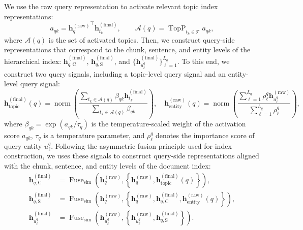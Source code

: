 \documentclass{article} %
\begin{document}
We use the raw query representation to activate relevant topic index representations:
\begin{equation}
a_{qk}
=
{\mathbf{h}_{q}^{(\mathrm{raw})}}^{\top}
\mathbf{h}_{t_k}^{(\mathrm{final})},
\qquad
\mathcal{A}(q)
=
\operatorname{TopP}_{t_k\in\mathcal{T}} a_{qk},
\label{eq:query_topic_activation}
\end{equation}
where $\mathcal{A}(q)$ is the set of activated topics. Then, we construct query-side representations that correspond to the chunk, sentence, and entity levels of the hierarchical index: $\mathbf{h}_{q,\mathrm{C}}^{(\mathrm{final})}$, $\mathbf{h}_{q,\mathrm{S}}^{(\mathrm{final})}$, and $\{\mathbf{h}_{u_{\ell}^{q}}^{(\mathrm{final})}\}_{\ell=1}^{L_q}$. To this end, we construct two query signals, including a topic-level query signal and an entity-level query signal:
\begin{equation}
\mathbf{h}_{\mathrm{topic}}^{(\mathrm{final})}(q)
=
\operatorname{norm}\!\left(
\frac{
\sum_{t_k\in\mathcal{A}(q)}
\beta_{qk}\mathbf{h}_{t_k}^{(\mathrm{final})}
}{
\sum_{t_k\in\mathcal{A}(q)}
\beta_{qk}
}
\right),
\quad
\mathbf{h}_{\mathrm{entity}}^{(\mathrm{raw})}(q)
=
\operatorname{norm}\!\left(
\frac{
\sum_{\ell=1}^{L_q}
\rho_{\ell}^{q}\mathbf{h}_{u_{\ell}^{q}}^{(\mathrm{raw})}
}{
\sum_{\ell=1}^{L_q}\rho_{\ell}^{q}
}
\right),
\label{eq:query_context_evidence_aggregation}
\end{equation}
where $\beta_{qk}=\exp(a_{qk}/\tau_q)$ is the temperature-scaled weight of the activation score $a_{qk}$, $\tau_q$ is a temperature parameter, and $\rho_{\ell}^{q}$ denotes the importance score of query entity $u_{\ell}^{q}$.  Following the asymmetric fusion principle used for index construction, we uses these signals to construct query-side representations aligned with the chunk, sentence, and entity levels of the document index:
\begin{equation}
\begin{aligned}
\mathbf{h}_{q,\mathrm{C}}^{(\mathrm{final})}
&=
\operatorname{Fuse}_{\mathrm{sim}}\!\left(
\mathbf{h}_{q}^{(\mathrm{raw})},
\left\{
\mathbf{h}_{q}^{(\mathrm{raw})},
\mathbf{h}_{\mathrm{topic}}^{(\mathrm{final})}(q)
\right\}
\right), \\
\mathbf{h}_{q,\mathrm{S}}^{(\mathrm{final})}
&=
\operatorname{Fuse}_{\mathrm{sim}}\!\left(
\mathbf{h}_{q}^{(\mathrm{raw})},
\left\{
\mathbf{h}_{q}^{(\mathrm{raw})},
\mathbf{h}_{q,\mathrm{C}}^{(\mathrm{final})},
\mathbf{h}_{\mathrm{entity}}^{(\mathrm{raw})}(q)
\right\}
\right), \\
\mathbf{h}_{u_{\ell}^{q}}^{(\mathrm{final})}
&=
\operatorname{Fuse}_{\mathrm{sim}}\!\left(
\mathbf{h}_{u_{\ell}^{q}}^{(\mathrm{raw})},
\left\{
\mathbf{h}_{u_{\ell}^{q}}^{(\mathrm{raw})},
\mathbf{h}_{q,\mathrm{S}}^{(\mathrm{final})}
\right\}
\right).
\end{aligned}
\label{eq:query_hierarchical_alignment}
\end{equation}
\end{document}
